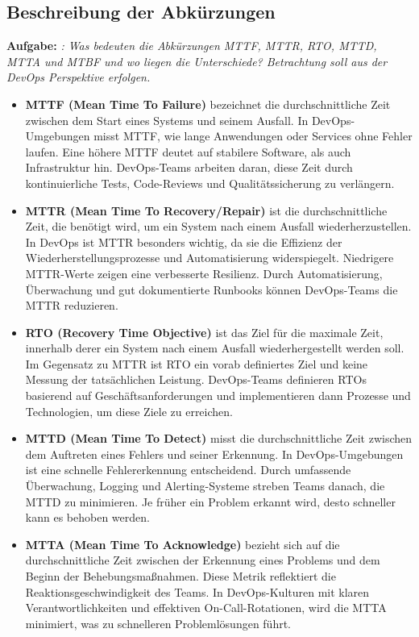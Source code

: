 \subsection{Beschreibung der Abkürzungen}
\textbf{Aufgabe:} \textit{: Was bedeuten die Abkürzungen MTTF, MTTR, RTO, MTTD, MTTA und MTBF und
wo liegen die Unterschiede? Betrachtung soll aus der DevOps Perspektive erfolgen.}

\begin{itemize}
    \item \textbf{MTTF (Mean Time To Failure)} bezeichnet die durchschnittliche Zeit zwischen
    dem Start eines Systems und seinem Ausfall. In DevOps-Umgebungen misst MTTF, wie lange
    Anwendungen oder Services ohne Fehler laufen. Eine höhere MTTF deutet auf stabilere Software,
    als auch Infrastruktur hin. DevOps-Teams arbeiten daran, diese Zeit durch kontinuierliche Tests,
    Code-Reviews und Qualitätssicherung zu verlängern.
    
    \item \textbf{MTTR (Mean Time To Recovery/Repair)} ist die durchschnittliche Zeit, die benötigt
    wird, um ein System nach einem Ausfall wiederherzustellen. In DevOps ist MTTR besonders wichtig,
    da sie die Effizienz der Wiederherstellungsprozesse und Automatisierung widerspiegelt.
    Niedrigere MTTR-Werte zeigen eine verbesserte Resilienz. Durch Automatisierung, Überwachung und
    gut dokumentierte Runbooks können DevOps-Teams die MTTR reduzieren.
    
    \item \textbf{RTO (Recovery Time Objective)} ist das Ziel für die maximale Zeit, innerhalb
    derer ein System nach einem Ausfall wiederhergestellt werden soll. Im Gegensatz zu MTTR ist
    RTO ein vorab definiertes Ziel und keine Messung der tatsächlichen Leistung. DevOps-Teams
    definieren RTOs basierend auf Geschäftsanforderungen und implementieren dann Prozesse und
    Technologien, um diese Ziele zu erreichen.
    
    \item \textbf{MTTD (Mean Time To Detect)} misst die durchschnittliche Zeit zwischen dem
    Auftreten eines Fehlers und seiner Erkennung. In DevOps-Umgebungen ist eine schnelle
    Fehlererkennung entscheidend. Durch umfassende Überwachung, Logging und Alerting-Systeme
    streben Teams danach, die MTTD zu minimieren. Je früher ein Problem erkannt wird, desto
    schneller kann es behoben werden.
    
    \item \textbf{MTTA (Mean Time To Acknowledge)} bezieht sich auf die durchschnittliche Zeit
    zwischen der Erkennung eines Problems und dem Beginn der Behebungsmaßnahmen. Diese Metrik
    reflektiert die Reaktionsgeschwindigkeit des Teams. In DevOps-Kulturen mit klaren
    Verantwortlichkeiten und effektiven On-Call-Rotationen, wird die MTTA minimiert,
    was zu schnelleren Problemlösungen führt.
    

\end{itemize}
